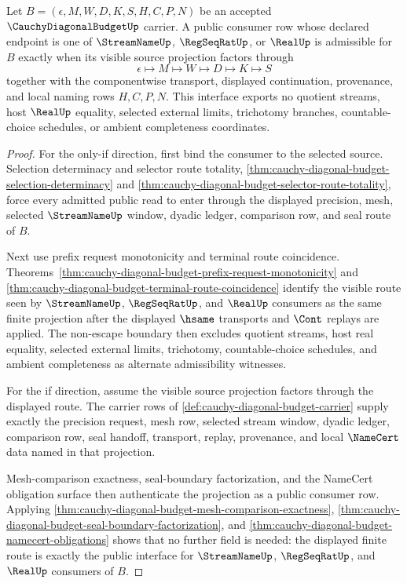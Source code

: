 \begin{theorem}
\label{thm:cauchy-diagonal-budget-real-regseq-streamname-factorization}
Let $B=(\epsilon,M,W,D,K,S,H,C,P,N)$ be an accepted $\CauchyDiagonalBudgetUp$ carrier. A public consumer row whose declared endpoint is one of $\StreamNameUp$, $\RegSeqRatUp$, or $\RealUp$ is admissible for $B$ exactly when its visible source projection factors through
$$
\epsilon \longmapsto M \longmapsto W \longmapsto D \longmapsto K \longmapsto S
$$
together with the componentwise transport, displayed continuation, provenance, and local naming rows $H,C,P,N$. This interface exports no quotient streams, host $\RealUp$ equality, selected external limits, trichotomy branches, countable-choice schedules, or ambient completeness coordinates.
\end{theorem}
\begin{proof}
For the only-if direction, first bind the consumer to the selected source. Selection determinacy and selector route totality, \autoref{thm:cauchy-diagonal-budget-selection-determinacy} and \autoref{thm:cauchy-diagonal-budget-selector-route-totality}, force every admitted public read to enter through the displayed precision, mesh, selected $\StreamNameUp$ window, dyadic ledger, comparison row, and seal route of $B$.

Next use prefix request monotonicity and terminal route coincidence. Theorems~\ref{thm:cauchy-diagonal-budget-prefix-request-monotonicity} and \ref{thm:cauchy-diagonal-budget-terminal-route-coincidence} identify the visible route seen by $\StreamNameUp$, $\RegSeqRatUp$, and $\RealUp$ consumers as the same finite projection after the displayed $\hsame$ transports and $\Cont$ replays are applied. The non-escape boundary then excludes quotient streams, host real equality, selected external limits, trichotomy, countable-choice schedules, and ambient completeness as alternate admissibility witnesses.

For the if direction, assume the visible source projection factors through the displayed route. The carrier rows of \autoref{def:cauchy-diagonal-budget-carrier} supply exactly the precision request, mesh row, selected stream window, dyadic ledger, comparison row, seal handoff, transport, replay, provenance, and local $\NameCert$ data named in that projection.

Mesh-comparison exactness, seal-boundary factorization, and the NameCert obligation surface then authenticate the projection as a public consumer row. Applying \autoref{thm:cauchy-diagonal-budget-mesh-comparison-exactness}, \autoref{thm:cauchy-diagonal-budget-seal-boundary-factorization}, and \autoref{thm:cauchy-diagonal-budget-namecert-obligations} shows that no further field is needed: the displayed finite route is exactly the public interface for $\StreamNameUp$, $\RegSeqRatUp$, and $\RealUp$ consumers of $B$.
\end{proof}

